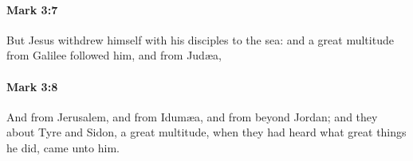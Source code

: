 		\paragraph{Mark 3:7} %
			\label{MARK-3-7}

			But Jesus withdrew himself with his disciples to the sea: and a great multitude from Galilee followed him, and from Judæa,

			\begin{framed}
			\scriptsize
				\begin{compactdesc}
					\item[SBLG] 
				\end{compactdesc}
			\end{framed}

		\paragraph{Mark 3:8} %
			\label{MARK-3-8}

			And from Jerusalem, and from Idumæa, and from beyond Jordan; and they about Tyre and Sidon, a great multitude, when they had heard what great things he did, came unto him.

